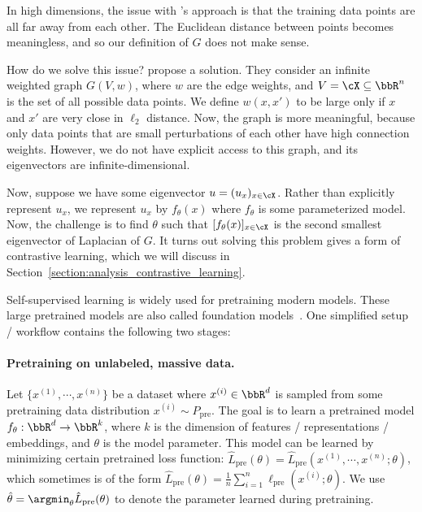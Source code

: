 In high dimensions, the issue with \citet{ng2001spectral}'s approach is that the training data points are all far away from each other. The Euclidean distance between points becomes meaningless, and so our definition of $G$ does not make sense. 

How do we solve this issue? \citet{haochen2021provable} propose a solution. They consider an infinite weighted graph $G(V, w)$, where $w$ are the edge weights, and $V = \cX \subseteq \bbR^n$ is the set of all possible data points. We define $w(x, x')$ to be large only if $x$ and $x'$ are very close in $\ell_2$ distance. Now, the graph is more meaningful, because only data points that are small perturbations of each other have high connection weights. However, we do not have explicit access to this graph, and its eigenvectors are infinite-dimensional. 

Now, suppose we have some eigenvector $u = (u_x)_{x \in \cX} $. Rather than explicitly represent $u_x$, we represent $u_x$ by $f_\theta(x)$ where $f_\theta$ is some parameterized model. Now, the challenge is to find $\theta$ such that $[f_\theta(x)]_{x \in \cX}$ is the second smallest eigenvector of Laplacian of $G$. It turns out solving this problem gives a form of contrastive learning, which we will discuss in Section~\ref{section:analysis_contrastive_learning}.



Self-supervised learning is widely used for pretraining modern models. These large pretrained models are also called foundation models~\cite{bommasani2021opportunities}. One simplified setup / workflow contains the following two stages:

\paragraph{Pretraining on unlabeled, massive data.} Let $\{x^{(1)}, \cdots, x^{(n)}\}$ be a dataset where $x^{(i)}\in\bbR^d$ is sampled from some pretraining data distribution $x^{(i)}\sim P_{\text{pre}}$. The goal is to learn a pretrained model $f_{\theta}: \bbR^d\rightarrow\bbR^k$, where $k$ is the dimension of features / representations / embeddings, and $\theta$ is the model parameter. This model can be learned by minimizing certain pretrained loss function: $\hat{L}_{\text{pre}}(\theta) = \hat{L}_{\text{pre}}(x^{(1)}, \cdots, x^{(n)}; \theta)$, which sometimes is of the form $\hat{L}_{\text{pre}}(\theta)  = \frac{1}{n}\sum_{i=1}^n \ell_{\text{pre}}(x^{(i)}; \theta)$. We use $\hat{\theta} = \argmin_{\theta}\hat{L}_{\text{pre}}(\theta)$ to denote the parameter learned during pretraining.

